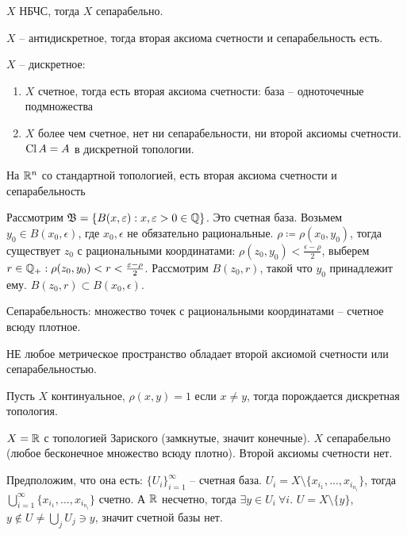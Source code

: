 \documentclass[main]{subfiles}
\begin{document}
\begin{example}
    $X$ НБЧС, тогда $X$ сепарабельно.
\end{example}
\begin{example}
    $X$ -- антидискретное, тогда вторая аксиома счетности и сепарабельность есть.
\end{example}
\begin{example}
    $X$ -- дискретное:
    \begin{enumerate}
        \item $X$ счетное, тогда есть вторая аксиома счетности: база -- одноточечные подмножества
        \item $X$ более чем счетное, нет ни сепарабельности, ни второй аксиомы счетности.
              $\operatorname{Cl} A=A$ в дискретной топологии.
    \end{enumerate}
\end{example}
\begin{example}
    На $\mathbb{R}^n$ со стандартной топологией, есть вторая аксиома счетности и сепарабельность

    Рассмотрим $\mathfrak{B} = \{B(x, \varepsilon): x, \varepsilon > 0 \in \mathbb{Q}\}$.
    Это счетная база.
    Возьмем  $y_0 \in B(x_0, \epsilon)$, где $x_0, \epsilon$ не обязательно рациональные.
    $\rho\coloneqq \rho(x_0, y_0)$, тогда существует $z_0$ с рациональными координатами:
    $\rho(z_0, y_0) < \frac{\epsilon - \rho}{2}$, выберем $r\in \mathbb{Q}_+: \rho(z_0, y_0)< r < \frac{\varepsilon- \rho}{2}$.
    Рассмотрим $B(z_0, r)$, такой что $y_0$ принадлежит ему.
    $B(z_0, r) \subset B(x_0, \epsilon)$.

    Сепарабельность: множество точек с рациональными координатами -- счетное всюду плотное.
\end{example}

\begin{remark}
    НЕ любое метрическое пространство обладает второй аксиомой счетности или сепарабельностью.

    Пусть $X$ континуальное, $\rho(x,y) = 1$ если $x \neq y$, тогда порождается дискретная топология.
\end{remark}

\begin{example}
    $X = \mathbb{R}$ с топологией Зариского (замкнутые, значит конечные).
    $X$ сепарабельно (любое бесконечное множество всюду плотно).
    Второй аксиомы счетности нет.

    Предположим, что она есть: $\{U_i\}_{i = 1}^\infty$ -- счетная база.
    $U_i = X \setminus \{x_{i_1}, ..., x_{i_{n_i}}\}$, тогда $\bigcup_{i=1}^\infty \{x_{i_1}, ..., x_{i_{n_i}}\}$ счетно.
    А $\mathbb{R}$ несчетно, тогда $\exists y \in U_i\ \forall i$.
    $U = X \setminus \{y\}$, $y \not \in U \neq \bigcup_j U_j \ni y$, значит счетной базы нет.
\end{example}
\end{document}
